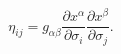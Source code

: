 \begin{equation}
\label{indmetric}
\eta_{ij}=g_{\alpha\beta}\frac{\partial x^{\alpha}}{\partial \sigma_i}\frac{\partial x^{\beta}}{\partial \sigma_j}.
\end{equation}

